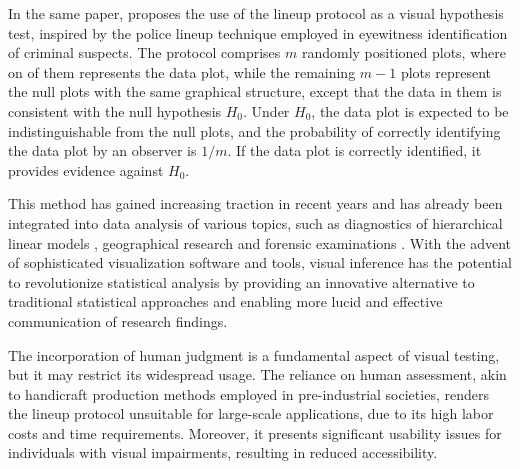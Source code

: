 \documentclass[11pt,a4paper,]{article}
\begin{document}
In the same paper, \textcite{buja_statistical_2009} proposes the use of the lineup protocol as a visual hypothesis test, inspired by the police lineup technique employed in eyewitness identification of criminal suspects. The protocol comprises \(m\) randomly positioned plots, where on of them represents the data plot, while the remaining \(m - 1\) plots represent the null plots with the same graphical structure, except that the data in them is consistent with the null hypothesis \(H_0\). Under \(H_0\), the data plot is expected to be indistinguishable from the null plots, and the probability of correctly identifying the data plot by an observer is \(1/m\). If the data plot is correctly identified, it provides evidence against \(H_0\).

This method has gained increasing traction in recent years and has already been integrated into data analysis of various topics, such as diagnostics of hierarchical linear models \autocite{loy2013diagnostic}, geographical research \autocite{widen_graphical_2016} and forensic examinations \autocite{krishnan_hierarchical_2021}.
With the advent of sophisticated visualization software and tools, visual inference has the potential to revolutionize statistical analysis by providing an innovative alternative to traditional statistical approaches and enabling more lucid and effective communication of research findings.

The incorporation of human judgment is a fundamental aspect of visual testing, but it may restrict its widespread usage. The reliance on human assessment, akin to handicraft production methods employed in pre-industrial societies, renders the lineup protocol unsuitable for large-scale applications, due to its high labor costs and time requirements. Moreover, it presents significant usability issues for individuals with visual impairments, resulting in reduced accessibility.
\end{document}

